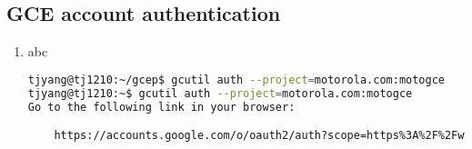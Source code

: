 \subsection{GCE account authentication}
\begin{enumerate}
\item abc
  \begin{lstlisting}[language=Bash]
tjyang@tj1210:~/gcep$ gcutil auth --project=motorola.com:motogce 
tjyang@tj1210:~$ gcutil auth --project=motorola.com:motogce 
Go to the following link in your browser:

    https://accounts.google.com/o/oauth2/auth?scope=https%3A%2F%2Fwww.googleapis.com%2Fauth%2Fcompute+https%3A%2F%2Fwww.googleapis.com%2Fauth%2Fcompute.readonly+https%3A%2F%2Fwww.googleapis.com%2Fauth%2Fdevstorage.full_control+https%3A%2F%2Fwww.googleapis.com%2Fauth%2Fdevstorage.read_only+https%3A%2F%2Fwww.googleapis.com%2Fauth%2Fdevstorage.read_write+https%3A%2F%2Fwww.googleapis.com%2Fauth%2Fdevstorage.write_only+https%3A%2F%2Fwww.googleapis.com%2Fauth%2Fuserinfo.email&redirect_uri=urn%3Aietf%3Awg%3Aoauth%3A2.0%3Aoob&response_type=code&client_id=1025389682001.apps.googleusercontent.com&access_type=offline


\end{lstlisting}
\end{enumerate}

